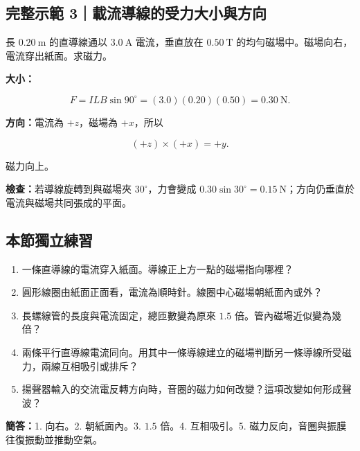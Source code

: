 \documentclass[11pt,a4paper]{article}
\providecommand{\tightlist}{%
  \setlength{\itemsep}{0pt}\setlength{\parskip}{0pt}}
\begin{document}
\begin{HandoutWorkedExample}

\subsection{完整示範 3｜載流導線的受力大小與方向}\label{ux5b8cux6574ux793aux7bc4-3ux8f09ux6d41ux5c0eux7ddaux7684ux53d7ux529bux5927ux5c0fux8207ux65b9ux5411}

長 \(0.20\ \mathrm m\) 的直導線通以 \(3.0\ \mathrm A\) 電流，垂直放在 \(0.50\ \mathrm T\) 的均勻磁場中。磁場向右，電流穿出紙面。求磁力。

\textbf{大小：}

\[
F=ILB\sin90^\circ
=(3.0)(0.20)(0.50)=0.30\ \mathrm N.
\]

\textbf{方向：}電流為 \(+z\)，磁場為 \(+x\)，所以

\[
(+z)\times(+x)=+y.
\]

磁力向上。

\textbf{檢查：}若導線旋轉到與磁場夾 \(30^\circ\)，力會變成 \(0.30\sin30^\circ=0.15\ \mathrm N\)；方向仍垂直於電流與磁場共同張成的平面。

\end{HandoutWorkedExample}

\begin{HandoutSelfCheck}

\subsection{本節獨立練習}\label{ux672cux7bc0ux7368ux7acbux7df4ux7fd2}

\begin{enumerate}
\def\labelenumi{\arabic{enumi}.}
\tightlist
\item
  一條直導線的電流穿入紙面。導線正上方一點的磁場指向哪裡？
\item
  圓形線圈由紙面正面看，電流為順時針。線圈中心磁場朝紙面內或外？
\item
  長螺線管的長度與電流固定，總匝數變為原來 \(1.5\) 倍。管內磁場近似變為幾倍？
\item
  兩條平行直導線電流同向。用其中一條導線建立的磁場判斷另一條導線所受磁力，兩線互相吸引或排斥？
\item
  揚聲器輸入的交流電反轉方向時，音圈的磁力如何改變？這項改變如何形成聲波？
\end{enumerate}

\textbf{簡答：}1. 向右。2. 朝紙面內。3. \(1.5\) 倍。4. 互相吸引。5. 磁力反向，音圈與振膜往復振動並推動空氣。

\end{HandoutSelfCheck}
\end{document}

